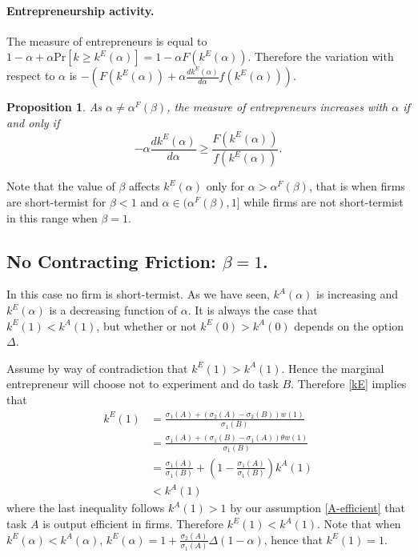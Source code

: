 \documentclass[12pt]{article}
\newtheorem{proposition}{Proposition} \theoremstyle{definition}
\begin{document}
\paragraph{Entrepreneurship activity.} The measure of entrepreneurs is equal to $1-\alpha+\alpha \text{Pr}[k\geq k^E(\alpha)]=1-\alpha F(k^E(\alpha))$. Therefore the variation with respect to $\alpha$ is $-(F(k^E(\alpha))+\alpha \frac{dk^E(\alpha)}{d\alpha}f(k^E(\alpha)))$. 

\begin{proposition}\label{prop:change-ent}
    As $\alpha\neq \alpha^F(\beta)$, the measure of entrepreneurs increases with $\alpha$ if and only if
    \begin{equation*}
      -\alpha \frac{dk^E(\alpha)}{d\alpha}\geq \frac{F(k^E(\alpha))}{f(k^E(\alpha))}.
    \end{equation*}
\end{proposition}
%
Note that the value of $\beta$ affects $k^E(\alpha)$ only for $\alpha>\alpha^F(\beta)$, that is when firms are short-termist for $\beta<1$ and $\alpha\in(\alpha^F(\beta),1]$ while firms are not short-termist in this range when $\beta=1$.



\subsection{No Contracting Friction: $\beta=1$.} In this case no firm is short-termist. As we have seen, $k^A(\alpha)$ is increasing and $k^E(\alpha)$ is a decreasing function of $\alpha$. It is always the case that $k^E(1)<k^A(1)$, but whether or not $k^E(0)>k^A(0)$ depends on the option $\Delta$.

Assume by way of contradiction that  $k^E(1)> k^A(1)$. Hence the marginal entrepreneur will choose not to experiment and do task $B$. Therefore \eqref{kE} implies that 
%
\begin{align*}
    k^E(1)&=\frac{\sigma_1(A)+(\sigma_2(A)-\sigma_2(B))w(1)}{\sigma_1(B)}\\ 
    &= \frac{\sigma_1(A)+(\sigma_1(B)-\sigma_1(A))\theta  w(1)}{\sigma_1(B)}\\ 
    &=\frac{\sigma_1(A)}{\sigma_1(B)}+\left(1-\frac{\sigma_1(A)}{\sigma_1(B)}\right)k^A(1)\\ 
    &<k^A(1)
\end{align*}
where the last inequality follows $k^A(1)>1$ by our assumption \ref{A-efficient} that task $A$ is output efficient in firms. Therefore $k^E(1)<k^A(1)$. Note that when $k^E(\alpha)<k^A(\alpha)$, $k^E(\alpha)=1+\frac{\sigma_2(A)}{\sigma_1(A)}\Delta(1-\alpha)$, hence that $k^E(1)=1$.
\end{document}
